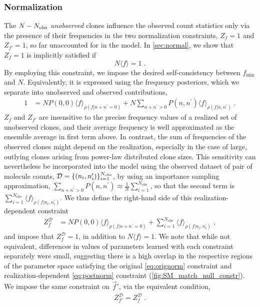 \documentclass[letterpaper,english,prl,reprint,longbibliography]{revtex4-1} %
\begin{document}
\subsubsection*{Normalization}
The $N-N_{\textrm{\textrm{obs}}}$ \emph{unobserved} clones influence the observed count statistics only via the presence of their frequencies in the two normalization constraints, $Z_f=1$ and $Z_{f'}=1$, so far unaccounted for in the model.
In \cref{sec:normal}, we show that $Z_f=1$ is implicitly satisfied if 
\begin{equation}
	N\langle f\rangle=1\;.\label{eq:orignorm}
\end{equation}
By employing this constraint, we impose the desired self-consistency between $f_\textrm{min}$ and $N$. Equivalently, it is expressed using the frequency posteriors, which we separate into unobserved and observed contributions,
\begin{align*}
	1&= NP(0,0) \langle f\rangle_{\rho(f|n+n^{\prime}=0)}+	N\sum_{n+n^{\prime}>0}P(n,n^{\prime})\langle f\rangle_{\rho(f|n,n^{\prime})}\;.
\end{align*}
$Z_f$ and $Z_{f'}$ are insensitive to the precise frequency values of a realized set of unobserved clones, and their average frequency is well approximated as the ensemble average in first term above. In contrast, the sum of frequencies of the observed clones might depend on the realization, especially in the case of large, outlying clones arising from power-law distributed clone sizes. This sensitivity can nevertheless be incorporated into the model using the observed dataset of pair of molecule counts, $\mathcal{D}=\{(n_i,n^{\prime}_i)\}_{i=1}^{N_{\textrm{\textrm{obs}}}}$, by using an importance sampling approximation, $\sum_{n+n^{\prime}>0}P(n,n^{\prime})\approx \frac{1}{N}\sum_{i=1}^{N_\textrm{obs}}$, so that the second term is $\sum_{i=1}^{N_{\textrm{obs}}}\langle f\rangle_{\rho(f|n_i,n^{\prime}_i)}$. We thus define the right-hand side of this realization-dependent constraint 
\begin{align}
	Z^\mathcal{D}_f&= N	P(0,0)\langle f\rangle_{\rho(f|n+n^{\prime}=0)} + \sum_{i=1}^{N_{\textrm{obs}}}\langle f\rangle_{\rho(f|n_i,n^{\prime}_i)}\;,\label{eq:postnorm}
\end{align}
and impose that $Z^\mathcal{D}_f=1$, in addition to $N\langle f\rangle=1$. We note that while not equivalent, differences in values of parameters learned with each constraint separately were small, suggesting there is a high overlap in the respective regions of the parameter space satisfying the original  \cref{eq:orignorm} constraint and realization-dependent \cref{eq:postnorm} constraint (\cref{fig:SM_match_null_constr}). We impose the same constraint on $\vec{f}'$, via the equivalent condition, 
\begin{align}
	Z^\mathcal{D}_{f'}=Z^\mathcal{D}_f\;.\label{eq:fprimeconst}
\end{align}
\end{document}
